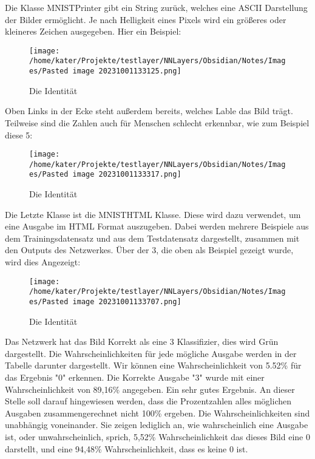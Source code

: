 \documentclass[12pt]{article}
\begin{document}
Die Klasse MNISTPrinter gibt ein String zurück, welches eine ASCII Darstellung der Bilder ermöglicht. Je nach Helligkeit eines Pixels wird ein größeres oder kleineres Zeichen ausgegeben. Hier ein Beispiel:\begin{figure}[H]
\centering
\texttt{[image: /home/kater/Projekte/testlayer/NNLayers/Obsidian/Notes/Images/Pasted image 20231001133125.png]}
\caption{Die Identität}
\label{Was kommt hier rein?}\end{figure}Oben Links in der Ecke steht außerdem bereits, welches Lable das Bild trägt. Teilweise sind die Zahlen auch für Menschen schlecht erkennbar, wie zum Beispiel diese 5:\begin{figure}[H]
\centering
\texttt{[image: /home/kater/Projekte/testlayer/NNLayers/Obsidian/Notes/Images/Pasted image 20231001133317.png]}
\caption{Die Identität}
\label{Was kommt hier rein?}\end{figure}Die Letzte Klasse ist die MNISTHTML Klasse. Diese wird dazu verwendet, um eine Ausgabe im HTML Format auszugeben. Dabei werden mehrere Beispiele aus dem Trainingsdatensatz und aus dem Testdatensatz dargestellt, zusammen mit den Outputs des Netzwerkes.
Über der 3, die oben als Beispiel gezeigt wurde, wird dies Angezeigt:\begin{figure}[H]
\centering
\texttt{[image: /home/kater/Projekte/testlayer/NNLayers/Obsidian/Notes/Images/Pasted image 20231001133707.png]}
\caption{Die Identität}
\label{Was kommt hier rein?}\end{figure}Das Netzwerk hat das Bild Korrekt als eine 3 Klassifizier, dies wird Grün dargestellt. Die Wahrscheinlichkeiten für jede mögliche Ausgabe werden in der Tabelle darunter dargestellt. Wir können eine Wahrscheinlichkeit von 5.52\% für das Ergebnis "0" erkennen. Die Korrekte Ausgabe "3" wurde mit einer Wahrscheinlichkeit von 89,16\% angegeben. Ein sehr gutes Ergebnis. An dieser Stelle soll darauf hingewiesen werden, dass die Prozentzahlen alles möglichen Ausgaben zusammengerechnet nicht 100\% ergeben. Die Wahrscheinlichkeiten sind unabhängig voneinander. Sie zeigen lediglich an, wie wahrscheinlich eine Ausgabe ist, oder unwahrscheinlich, sprich, 5,52\% Wahrscheinlichkeit das dieses Bild eine 0 darstellt, und eine 94,48\% Wahrscheinlichkeit, dass es keine 0 ist.
\end{document}
